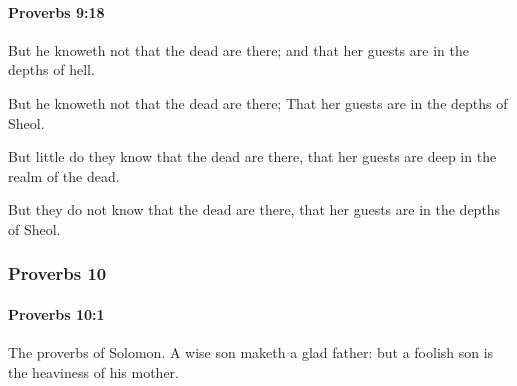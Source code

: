 		\paragraph{Proverbs 9:18} %
			\label{PROVERBS-9-18}

			But he knoweth not that the dead are there; and that her guests are in the depths of hell.

			\begin{versebox}
					\item[BHS] 
					\item[ASV] But he knoweth not that the dead are there; That her guests are in the depths of Sheol.
					\item[NIV] But little do they know that the dead are there, that her guests are deep in the realm of the dead.
					\item[NRSV] But they do not know that the dead are there, that her guests are in the depths of Sheol.
			\end{versebox}
	\subsubsection{Proverbs 10} %
		\label{PROVERBS-10}

		\paragraph{Proverbs 10:1} %
			\label{PROVERBS-10-1}

			The proverbs of Solomon. A wise son maketh a glad father: but a foolish son is the heaviness of his mother.

